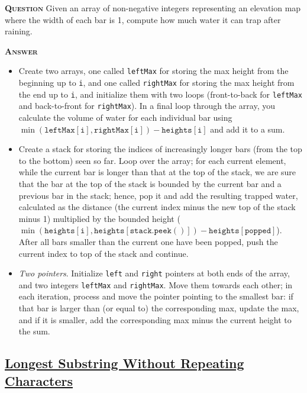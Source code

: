 \documentclass[table, xcdraw]{article}%
\begin{document}
\textsc{\textbf{Question}} Given an array of non-negative integers representing an elevation map where the width of each bar is 1, compute how much water it can trap after raining.

\textsc{\textbf{Answer}}

\begin{itemize}
    \item Create two arrays, one called \texttt{leftMax} for storing the max height from the beginning up to \texttt{i}, and one called \texttt{rightMax} for storing the max height from the end up to \texttt{i}, and initialize them with two loops (front-to-back for \texttt{leftMax} and back-to-front for \texttt{rightMax}). In a final loop through the array, you calculate the volume of water for each individual bar using $\min(\mathtt{leftMax[i]}, \mathtt{rightMax[i]}) - \mathtt{heights[i]}$ and add it to a sum.
    \item Create a stack for storing the indices of increasingly longer bars (from the top to the bottom) seen so far. Loop over the array; for each current element, while the current bar is longer than that at the top of the stack, we are sure that the bar at the top of the stack is bounded by the current bar and a previous bar in the stack; hence, pop it and add the resulting trapped water, calculated as the distance (the current index minus the new top of the stack minus 1) multiplied by the bounded height ($\min(\mathtt{heights[i]}, \mathtt{heights[stack.peek()]}) - \mathtt{heights[popped]}$). After all bars smaller than the current one have been popped, push the current index to top of the stack and continue.
    \item \textit{Two pointers}. Initialize \texttt{left} and \texttt{right} pointers at both ends of the array, and two integers \texttt{leftMax} and \texttt{rightMax}. Move them towards each other; in each iteration, process and move the pointer pointing to the smallest bar: if that bar is larger than (or equal to) the corresponding max, update the max, and if it is smaller, add the corresponding max minus the current height to the sum.
\end{itemize}

\subsection{\href{https://leetcode.com/problems/longest-substring-without-repeating-characters}{Longest Substring Without Repeating Characters}}
\end{document}
